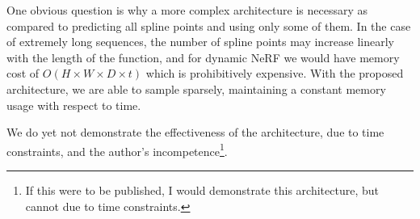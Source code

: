 One obvious question is why a more complex architecture is necessary as compared to predicting all spline points and using only some of them. In the case of extremely long sequences, the number of spline points may increase linearly with the length of the function, and for dynamic NeRF we would have memory cost of $O(H\times W\times D\times t)$ which is prohibitively expensive. With the proposed architecture, we are able to sample sparsely, maintaining a constant memory usage with respect to time.

We do yet not demonstrate the effectiveness of the architecture, due to time constraints, and the author's incompetence\footnote{If this were to be published, I would demonstrate this architecture, but cannot due to time constraints.}.
\fi